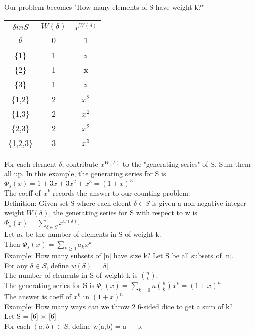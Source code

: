 \documentclass[12pt]{article}
\begin{document}
	Our problem becomes "How many elements of S have weight k?"\\
	\begin{tabular}{ c | c | c}
		$\delta in S$ & $W(\delta)$ & $x^{W(\delta)}$\\ \hline
		$\theta$ & 0 & 1 \\
		\{1\} & 1 & x \\
		\{2\} & 1 & x \\
		\{3\} & 1 & x \\
		\{1,2\} & 2 & $x^2$\\
		\{1,3\} & 2 & $x^2$\\
		\{2,3\} & 2 & $x^2$\\
		\{1,2,3\} & 3 & $x^3$\\
	\end{tabular}
	
	For each element $\delta$, contribute $x^{W(\delta)}$ to the "generating series" of S. Sum them all up. In this example, the generating series for S is $\Phi_s(x) = 1 + 3x + 3x^2 + x^3 = (1+x)^3$\\
	The coeff of $x^k$ records the answer to our counting problem.\\
	
	Definition: Given set S where each eleent $\delta \in S$ is given a non-negative integer weight $W(\delta)$, the generating series for S with respect to w is $\Phi_s(x) = \sum_{\delta \in S}x^{w(\delta)}$.\\
	
	Let $a_k$ be the number of elements in S of weight k.\\
	Then $\Phi_s(x) = \sum_{k \geq 0}a_kx^k$\\
	
	Example: How many subsets of [n] have size k?
	Let S be all subsets of [n].\\
	For any $\delta \in S$, define $w(\delta) = |\delta|$\\
	
	The number of elements in S of weight k is ${n \choose k}$:\\
	The generating series for S is $\Phi_s(x) = \sum_{k = 0}{n}{n \choose k}x^k = (1+x)^n$\\
	The answer is coeff of $x^k$ in $(1+x)^n$\\
	
	Example: How many ways can we throw 2 6-sided dice to get a sum of k?\\
	
	Let S = [6] $\times$ [6]\\
	For each $(a,b) \in S$, define w(a,b) = a + b.\\
	
\end{document}
